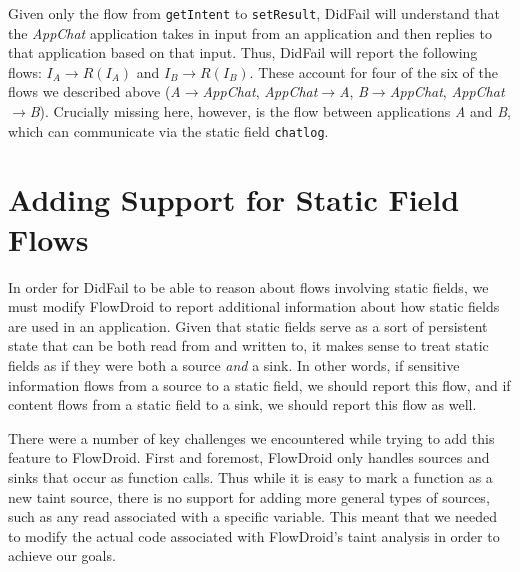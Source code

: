 Given only the flow from \texttt{getIntent} to \texttt{setResult}, DidFail will understand that the \emph{AppChat} application takes in input from an application and then replies to that application based on that input. Thus, DidFail will report the following flows: $I_A\rightarrow R(I_A)$ and $I_B\rightarrow R(I_B)$. These account for four of the six of the flows we described above (\emph{A$\rightarrow$AppChat}, \emph{AppChat$\rightarrow$A}, \emph{B$\rightarrow$AppChat}, \emph{AppChat$\rightarrow$B}). Crucially missing here, however, is the flow between applications \emph{A} and \emph{B}, which can communicate via the static field \texttt{chatlog}. 

\section{Adding Support for Static Field Flows}

In order for DidFail to be able to reason about flows involving static fields, we must modify FlowDroid to report additional information about how static fields are used in an application. Given that static fields serve as a sort of persistent state that can be both read from and written to, it makes sense to treat static fields as if they were both a source \emph{and} a sink. In other words, if sensitive information flows from a source to a static field, we should report this flow, and if content flows from a static field to a sink, we should report this flow as well.

There were a number of key challenges we encountered while trying to add this feature to FlowDroid. First and foremost, FlowDroid only handles sources and sinks that occur as function calls. Thus while it is easy to mark a function as a new taint source, there is no support for adding more general types of sources, such as any read associated with a specific variable. This meant that we needed to modify the actual code associated with FlowDroid's taint analysis in order to achieve our goals.


